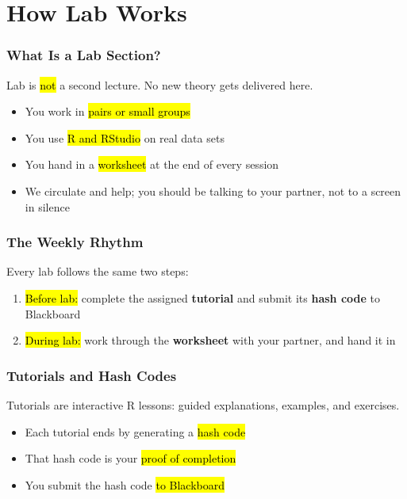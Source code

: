 \documentclass[slidestop,compress,mathserif]{beamer}
\begin{document}
\section{How Lab Works}

\begin{frame}
	\frametitle{What Is a Lab Section?}
	Lab is \hl{not} a second lecture. No new theory gets delivered here.
	\vfill
	\begin{itemize}
		\item You work in \hl{pairs or small groups}
		\item You use \hl{R and RStudio} on real data sets
		\item You hand in a \hl{worksheet} at the end of every session
		\item We circulate and help; you should be talking to your partner, not to a screen in silence
	\end{itemize}
	\vfill
\end{frame}

\begin{frame}
	\frametitle{The Weekly Rhythm}
	Every lab follows the same two steps:
	\vfill
	\begin{enumerate}
		\item \hl{Before lab:} complete the assigned \textbf{tutorial} and submit its \textbf{hash code} to Blackboard
		\item \hl{During lab:} work through the \textbf{worksheet} with your partner, and hand it in
	\end{enumerate}
	\vfill
\end{frame}

\begin{frame}
	\frametitle{Tutorials and Hash Codes}
	Tutorials are interactive R lessons: guided explanations, examples, and exercises.
	\vfill
	\begin{itemize}
		\item Each tutorial ends by generating a \hl{hash code}
		\item That hash code is your \hl{proof of completion}
		\item You submit the hash code \hl{to Blackboard}
	\end{itemize}
	\vfill
\end{frame}
\end{document}
